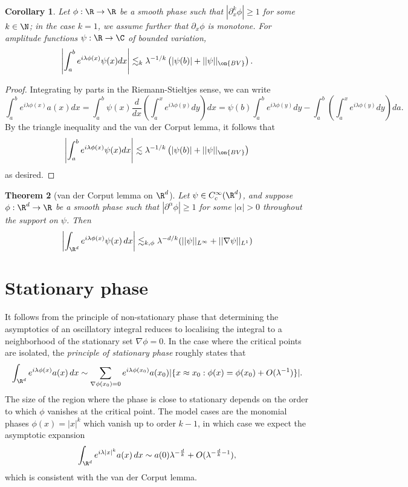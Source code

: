 \documentclass[reqno]{amsart}
\newtheorem{theorem}{Theorem}
\newtheorem{corollary}[theorem]{Corollary}
\theoremstyle{definition}
\theoremstyle{remark}
\begin{document}
\begin{corollary}
	Let $\phi : \R \to \R$ be a smooth phase such that $|\partial^k_x \phi| \geq 1$ for some $k \in \N$; in the case $k = 1$, we assume further that $\partial_x \phi$ is monotone. For amplitude functions $\psi: \R \to \C$ of bounded variation,
		\[  \left|\int_a^b e^{i \lambda \phi(x)} \psi(x) dx \right| \lesssim_k \lambda^{-1/k} \left( |\psi(b)| + ||\psi||_{\on{BV}} \right). \]
\end{corollary}

\begin{proof}
	Integrating by parts in the Riemann-Stieltjes sense, we can write
	\[\int_a^b e^{i \lambda \phi(x)} a(x) dx = \int_a^b \psi(x) \frac{d}{dx} \left( \int_a^x e^{i \lambda \phi(y)} dy\right) dx = \psi(b) \int_a^b e^{i \lambda \phi(y)} dy - \int_a^b \left( \int_a^x e^{i \lambda \phi(y)} dy \right) d a. \]
	By the triangle inequality and the van der Corput lemma, it follows that 
	\[ \left|\int_a^b e^{i \lambda \phi(x)} \psi(x) dx\right| \lesssim \lambda^{-1/k} \left( |\psi(b)| + ||\psi||_{\on{BV}} \right) \]
	as desired. 	
\end{proof}

\begin{theorem}[van der Corput lemma on $\R^d$]
	Let $\psi \in C^\infty_c (\R^d)$, and suppose $\phi : \R^d \to \R$ be a smooth phase such that $|\partial^\alpha \phi| \geq 1$ for some $|\alpha| > 0$ throughout the support on $\psi$. Then 
		\[ \left| \int_{\R^d} e^{i \lambda \phi(x)} \psi(x) \, dx \right| \lesssim_{k, \phi} \lambda^{-d/k} (||\psi||_{L^\infty} + ||\nabla \psi||_{L^1})\]
\end{theorem}

\section{Stationary phase}

It follows from the principle of non-stationary phase that determining the asymptotics of an oscillatory integral reduces to localising the integral to a neighborhood of the stationary set $\nabla \phi = 0$. In the case where the critical points are isolated, the \textit{principle of stationary phase} roughly states that 
	\[ \int_{\R^d} e^{i \lambda \phi(x)} a(x) \, dx \sim \sum_{\nabla \phi(x_0) = 0} e^{i \lambda \phi(x_0)}  a(x_0) |\{ x \approx x_0 : \phi(x) = \phi(x_0) + O(\lambda^{-1}) \}|. \]
The size of the region where the phase is close to stationary depends on the order to which $\phi$ vanishes at the critical point. The model cases are the monomial phases $\phi(x) = |x|^k$ which vanish up to order $k - 1$, in which case we expect the asymptotic expansion
	\[ \int_{\R^d} e^{i \lambda |x|^k} a(x) \, dx \sim a(0) \lambda^{-\frac{d}{k}} + O(\lambda^{-\frac{d}{k} - 1}), \]
which is consistent with the van der Corput lemma.  
\end{document}
